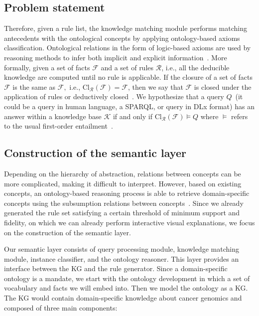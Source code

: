 \subsection{Problem statement}
Therefore, given a rule list, the knowledge matching module performs matching antecedents with the ontological concepts by applying ontology-based axioms classification. Ontological relations in the form of logic-based axioms are used by reasoning methods to infer both implicit and explicit information~\cite{alirezaie2017ontology}. More formally, given a set of facts $\mathcal{F}$ and a set of rules $\mathcal{R}$, i.e., all the deducible knowledge are computed until no rule is applicable. If the closure of a set of facts $\mathcal{F}$ is the same as $\mathcal{F},$ i.e., $\mathrm{Cl}_{\mathcal{R}}(\mathcal{F})=\mathcal{F}$, then we say that $\mathcal{F}$ is closed under the application of rules or deductively closed~\cite{garoufallou2016metadata}. We hypothesize that a query $Q$~(it could be a query in human language, a SPARQL, or query in DLx format) has an answer within a knowledge base $\mathcal{K}$ if and only if $\mathrm{Cl}_{\mathcal{R}}(\mathcal{F}) \models Q$ where $\models$ refers to the usual first-order entailment~\cite{garoufallou2016metadata}. 

\subsection{Construction of the semantic layer}
Depending on the hierarchy of abstraction, relations between concepts can be more complicated, making it difficult to interpret. However, based on existing concepts, an ontology-based reasoning process is able to retrieve  domain-specific concepts using the subsumption relations between concepts~\cite{alirezaie2019semantic}. Since we already generated the rule set satisfying a certain threshold of minimum support and fidelity, on which we can already perform interactive visual explanations, we focus on the construction of the semantic layer. 

\hspace*{3.5mm} Our semantic layer consists of query processing module, knowledge matching module, instance classifier, and the ontology reasoner. This layer provides an interface between the KG and the rule generator. Since a domain-specific ontology is a mandate, we start with the ontology development in which a set of vocabulary and facts we will embed into. Then we model the ontology as a KG. The KG would contain domain-specific knowledge about cancer genomics and composed of three main components:

